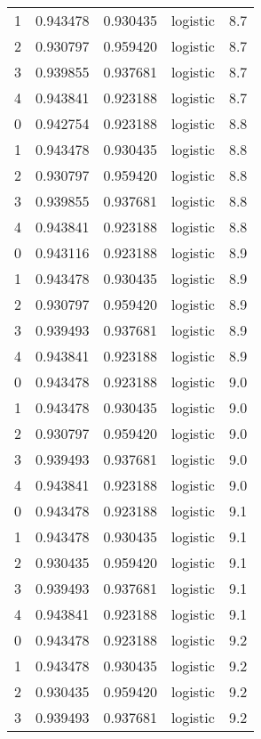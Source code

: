 \begin{tabular}{rrrlr}
     1 & 0.943478 & 0.930435 & logistic &        8.7 \\
     2 & 0.930797 & 0.959420 & logistic &        8.7 \\
     3 & 0.939855 & 0.937681 & logistic &        8.7 \\
     4 & 0.943841 & 0.923188 & logistic &        8.7 \\
     0 & 0.942754 & 0.923188 & logistic &        8.8 \\
     1 & 0.943478 & 0.930435 & logistic &        8.8 \\
     2 & 0.930797 & 0.959420 & logistic &        8.8 \\
     3 & 0.939855 & 0.937681 & logistic &        8.8 \\
     4 & 0.943841 & 0.923188 & logistic &        8.8 \\
     0 & 0.943116 & 0.923188 & logistic &        8.9 \\
     1 & 0.943478 & 0.930435 & logistic &        8.9 \\
     2 & 0.930797 & 0.959420 & logistic &        8.9 \\
     3 & 0.939493 & 0.937681 & logistic &        8.9 \\
     4 & 0.943841 & 0.923188 & logistic &        8.9 \\
     0 & 0.943478 & 0.923188 & logistic &        9.0 \\
     1 & 0.943478 & 0.930435 & logistic &        9.0 \\
     2 & 0.930797 & 0.959420 & logistic &        9.0 \\
     3 & 0.939493 & 0.937681 & logistic &        9.0 \\
     4 & 0.943841 & 0.923188 & logistic &        9.0 \\
     0 & 0.943478 & 0.923188 & logistic &        9.1 \\
     1 & 0.943478 & 0.930435 & logistic &        9.1 \\
     2 & 0.930435 & 0.959420 & logistic &        9.1 \\
     3 & 0.939493 & 0.937681 & logistic &        9.1 \\
     4 & 0.943841 & 0.923188 & logistic &        9.1 \\
     0 & 0.943478 & 0.923188 & logistic &        9.2 \\
     1 & 0.943478 & 0.930435 & logistic &        9.2 \\
     2 & 0.930435 & 0.959420 & logistic &        9.2 \\
     3 & 0.939493 & 0.937681 & logistic &        9.2 \\

\end{tabular}

